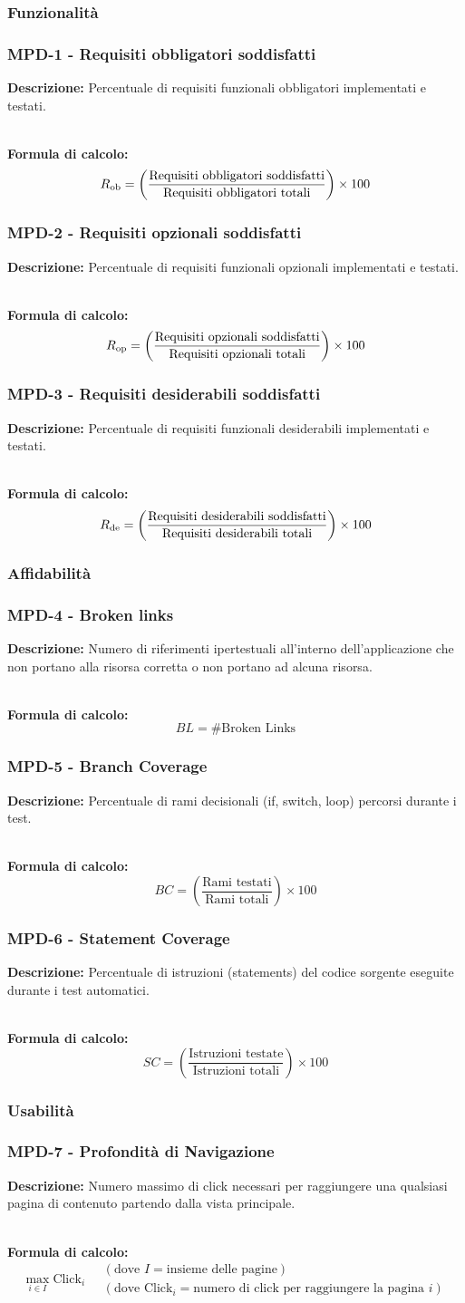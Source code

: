 \documentclass[a4paper,12pt]{article}
\newcommand{\metricdef}[3]{
    \subsubsection*{#1 - #2}
    \textbf{Descrizione:} #3
}
\newcommand{\metricformula}[1]{
    \\[0.5em]
    \textbf{Formula di calcolo:}
    \begin{equation*}
        #1
    \end{equation*}
}
\begin{document}
\subsubsection{Funzionalità}

\metricdef{MPD-1}{Requisiti obbligatori soddisfatti}{Percentuale di requisiti funzionali obbligatori implementati e testati.}
\metricformula{R\textsubscript{ob} = \left( \frac{\text{Requisiti obbligatori soddisfatti}}{\text{Requisiti obbligatori totali}} \right) \times 100}

\metricdef{MPD-2}{Requisiti opzionali soddisfatti}{Percentuale di requisiti funzionali opzionali implementati e testati.}
\metricformula{R\textsubscript{op} = \left( \frac{\text{Requisiti opzionali soddisfatti}}{\text{Requisiti opzionali totali}} \right) \times 100}

\metricdef{MPD-3}{Requisiti desiderabili soddisfatti}{Percentuale di requisiti funzionali desiderabili implementati e testati.}
\metricformula{R\textsubscript{de} = \left( \frac{\text{Requisiti desiderabili soddisfatti}}{\text{Requisiti desiderabili totali}} \right) \times 100}

\subsubsection{Affidabilità}

\metricdef{MPD-4}{Broken links}{Numero di riferimenti ipertestuali all'interno dell'applicazione che non portano alla risorsa corretta o non portano ad alcuna risorsa.}
\metricformula{BL = \#\text{Broken Links}}

\metricdef{MPD-5}{Branch Coverage}{Percentuale di rami decisionali (if, switch, loop) percorsi durante i test.}
\metricformula{BC = \left( \frac{\text{Rami testati}}{\text{Rami totali}} \right) \times 100}

\metricdef{MPD-6}{Statement Coverage}{Percentuale di istruzioni (statements) del codice sorgente eseguite durante i test automatici.}
\metricformula{SC = \left( \frac{\text{Istruzioni testate}}{\text{Istruzioni totali}} \right) \times 100}

\subsubsection{Usabilità}

\metricdef{MPD-7}{Profondità di Navigazione}{Numero massimo di click necessari per raggiungere una qualsiasi pagina di contenuto partendo dalla vista principale.}
\metricformula{\max_{i \in I} \text{Click}_i \quad \begin{array}{l} (\text{dove } I = \text{insieme delle pagine}) \\ (\text{dove } \text{Click}_i = \text{numero di click per raggiungere la pagina } i) \end{array}}
\end{document}
